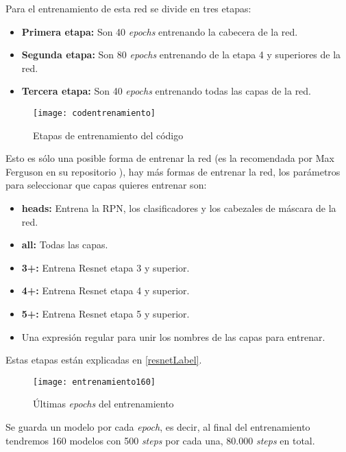 Para el entrenamiento de esta red se divide en tres etapas:

\begin{itemize}
    \item \textbf{Primera etapa:} Son 40 \textit{epochs} entrenando la cabecera de la red.
    \item \textbf{Segunda etapa:} Son 80 \textit{epochs} entrenando de la etapa 4 y superiores de la red.
    \item \textbf{Tercera etapa:} Son 40 \textit{epochs} entrenando todas las capas de la red.
\end{itemize}

\begin{figure}[h]
    \centering
    \texttt{[image: codentrenamiento]}
    \caption{Etapas de entrenamiento del código}
    \label{codentrenamiento}
\end{figure}

Esto es sólo una posible forma de entrenar la red (es la recomendada por Max Ferguson en su repositorio \cite{metal-defect-detection:repositorio}), hay más formas de entrenar la red, los parámetros para seleccionar que capas quieres entrenar son:

\begin{itemize}
    \item \textbf{heads:} Entrena la RPN, los clasificadores y los cabezales de máscara de la red.
    \item \textbf{all:} Todas las capas.
    \item \textbf{3+:} Entrena Resnet etapa 3 y superior.
    \item \textbf{4+:} Entrena Resnet etapa 4 y superior.
    \item \textbf{5+:} Entrena Resnet etapa 5 y superior.
    \item Una expresión regular para unir los nombres de las capas para entrenar.
\end{itemize}

Estas etapas están explicadas en \ref{resnetLabel}.

\begin{figure}[h]
	\centering
	\texttt{[image: entrenamiento160]}
	\caption{Últimas \textit{epochs} del entrenamiento}
	\label{entrenamiento160}
\end{figure}

Se guarda un modelo por cada \textit{epoch}, es decir, al final del entrenamiento tendremos 160 modelos con 500 \textit{steps} por cada una, 80.000 \textit{steps} en total.

